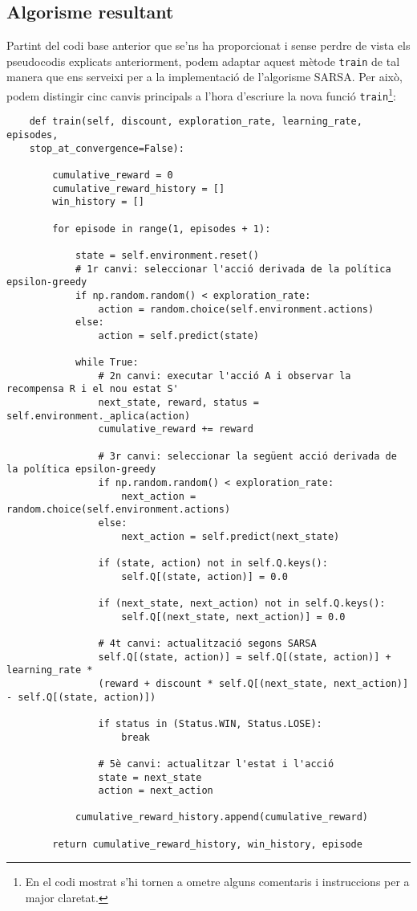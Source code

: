\documentclass{article}
\begin{document}
\subsection{Algorisme resultant}
Partint del codi base anterior que se'ns ha proporcionat i sense perdre de vista els pseudocodis explicats anteriorment, podem adaptar aquest mètode \verb|train| de tal manera que ens serveixi per a la implementació de l'algorisme SARSA. Per això, podem distingir cinc canvis principals a l'hora d'escriure la nova funció \verb|train|\footnote{En el codi mostrat s'hi tornen a ometre alguns comentaris i instruccions per a major claretat.}:
\begin{verbatim}
    def train(self, discount, exploration_rate, learning_rate, episodes, 
    stop_at_convergence=False):
    
        cumulative_reward = 0
        cumulative_reward_history = []
        win_history = []

        for episode in range(1, episodes + 1):
            
            state = self.environment.reset()
            # 1r canvi: seleccionar l'acció derivada de la política epsilon-greedy
            if np.random.random() < exploration_rate:
                action = random.choice(self.environment.actions)
            else:
                action = self.predict(state)

            while True:
                # 2n canvi: executar l'acció A i observar la recompensa R i el nou estat S'
                next_state, reward, status = self.environment._aplica(action)
                cumulative_reward += reward

                # 3r canvi: seleccionar la següent acció derivada de la política epsilon-greedy
                if np.random.random() < exploration_rate:
                    next_action = random.choice(self.environment.actions)
                else:
                    next_action = self.predict(next_state)

                if (state, action) not in self.Q.keys():
                    self.Q[(state, action)] = 0.0
                
                if (next_state, next_action) not in self.Q.keys():
                    self.Q[(next_state, next_action)] = 0.0

                # 4t canvi: actualització segons SARSA
                self.Q[(state, action)] = self.Q[(state, action)] + learning_rate *
                (reward + discount * self.Q[(next_state, next_action)] - self.Q[(state, action)])

                if status in (Status.WIN, Status.LOSE): 
                    break

                # 5è canvi: actualitzar l'estat i l'acció
                state = next_state
                action = next_action

            cumulative_reward_history.append(cumulative_reward)

        return cumulative_reward_history, win_history, episode
\end{verbatim}
\newpage 
\end{document}
